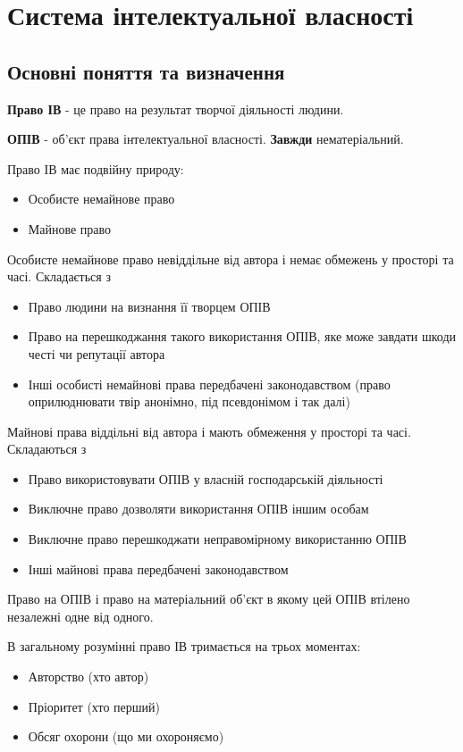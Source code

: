 \section{Система інтелектуальної власності}
\subsection{Основні поняття та визначення}
\textbf{Право ІВ} - це право на результат творчої діяльності людини.

\textbf{ОПІВ} - об’єкт права інтелектуальної власності. \textbf{Завжди} нематеріальний.

Право ІВ має подвійну природу: 
\begin{itemize}
	\item Особисте немайнове право
	\item Майнове право
\end{itemize}

Особисте немайнове право невіддільне від автора і немає обмежень у просторі та часі. Складається з
\begin{itemize}
	\item Право людини на визнання її творцем ОПІВ
	\item Право на перешкоджання такого використання ОПІВ, яке може завдати шкоди честі чи репутації автора
	\item Інші особисті немайнові права передбачені законодавством (право оприлюднювати твір анонімно, під псевдонімом і так далі)
\end{itemize}

Майнові права віддільні від автора і мають обмеження у просторі та часі. Складаються з
\begin{itemize}
	\item Право використовувати ОПІВ у власній господарській діяльності
	\item Виключне право дозволяти використання ОПІВ іншим особам
	\item Виключне право перешкоджати неправомірному використанню ОПІВ
	\item Інші майнові права передбачені законодавством
\end{itemize}

Право на ОПІВ і право на матеріальний об’єкт в якому цей ОПІВ втілено незалежні одне від одного. 

В загальному розумінні право ІВ тримається на трьох моментах:
\begin{itemize}
	\item Авторство (хто автор)
	\item Пріоритет (хто перший)
	\item Обсяг охорони (що ми охороняємо)
\end{itemize}

